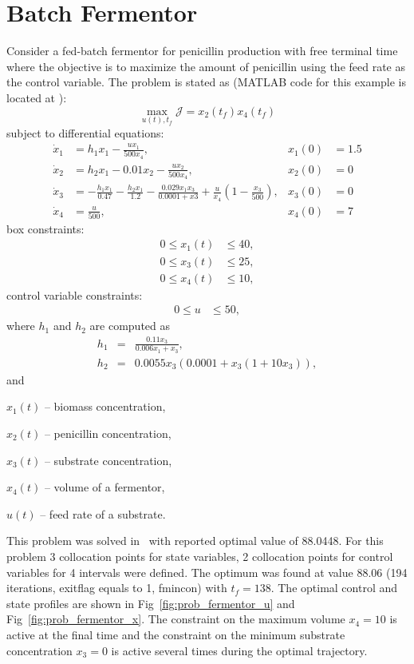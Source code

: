 \section{Batch Fermentor}
\label{sec:prob_fermentor}
Consider a fed-batch fermentor for penicillin production with free
terminal time~\citep{ban05} where the objective is to maximize the
amount of penicillin using the feed rate as the control variable. The
problem is stated as (MATLAB code for this example is located at
): 
\begin{equation}
\max_{u(t),t_f} \mathcal{J} = x_{2}(t_{f})x_{4}(t_{f})
\end{equation}
subject to differential equations:
\begin{align}
\dot{x}_1 & = 
h_1x_1-\frac{u x_1}{500 x_4}, &
x_1(0) &= 1.5  \\
\dot{x}_2 & = 
h_2x_1-0.01x_2-\frac{ux_2}{500x_4}, &
x_2(0) &= 0  \\
\dot{x}_3 &=
-\frac{h_1x_1}{0.47}-\frac{h_2x_1}{1.2}-\frac{0.029x_1x_3}{0.0001+x3}
  +\frac{u}{x_4} \left( 1-\frac{x_3}{500} \right),
&
x_3(0) &= 0 \\ 
\dot{x}_4 &= \frac{u}{500}, &
x_4(0) &= 7
\end{align}
box constraints:
\begin{align}
0 \le x_1(t) &\le 40, \\
0 \le x_3(t) &\le 25, \\
0 \le x_4(t) &\le 10, 
\end{align}
control variable constraints:
\begin{align}
0 \le u &\le 50, 
\end{align}
where $h_1$ and $h_2$ are computed as
\begin{eqnarray} 
h_1 &=& \frac{0.11x_3}{0.006x_1+x_3}, \\
h_2 &=& 0.0055x_3(0.0001+x_3(1+10x_3)),
\end{eqnarray}
and 
\begin{description}
	\item $x_1(t)$ -- biomass concentration,
	\item $x_2(t)$ -- penicillin concentration,
	\item $x_3(t)$ -- substrate concentration,
	\item $x_4(t)$ -- volume of a fermentor,
	\item $u(t)$ -- feed rate of a substrate.
\end{description}

This problem was solved in~\citep{rut10} with reported optimal value
of 88.0448. For this problem 3 collocation points for state variables,
2 collocation points for control variables for 4 intervals were
defined. The optimum was found at value 88.06 (194 iterations,
exitflag equals to 1, fmincon) with $t_f = 138$. The optimal control
and state profiles are shown in Fig~\ref{fig:prob_fermentor_u} and
Fig~\ref{fig:prob_fermentor_x}. The constraint on the maximum volume
$x_4=10$ is active at the final time and the constraint on the minimum
substrate concentration $x_3=0$ is active several times during the
optimal trajectory.

